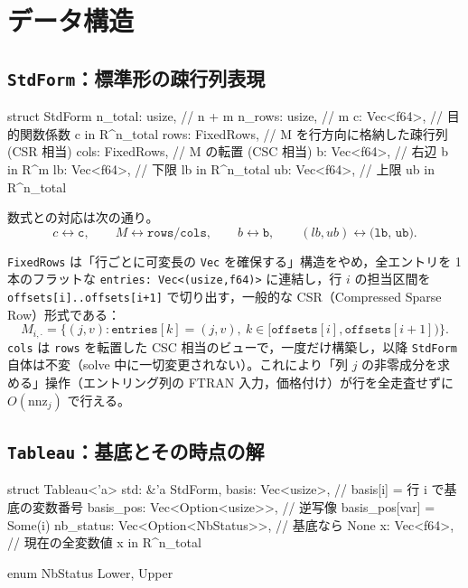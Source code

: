 \documentclass[11pt,a4paper]{ltjsarticle}
\newcommand{\code}[1]{\texttt{#1}}
\begin{document}
\section{データ構造}

\subsection{\code{StdForm}：標準形の疎行列表現}

\begin{rustcode}
struct StdForm {
    n_total: usize,      // n + m
    n_rows:  usize,      // m
    c:   Vec<f64>,       // 目的関数係数 c in R^{n_total}
    rows: FixedRows,     // M を行方向に格納した疎行列 (CSR 相当)
    cols: FixedRows,     // M の転置 (CSC 相当)
    b:   Vec<f64>,       // 右辺 b in R^m
    lb:  Vec<f64>,       // 下限 lb in R^{n_total}
    ub:  Vec<f64>,       // 上限 ub in R^{n_total}
}
\end{rustcode}

数式との対応は次の通り。
\[
  c \leftrightarrow \code{c},\qquad
  M \leftrightarrow \code{rows}/\code{cols},\qquad
  b \leftrightarrow \code{b},\qquad
  (lb,ub) \leftrightarrow \code{(lb, ub)}.
\]

\code{FixedRows} は「行ごとに可変長の \code{Vec} を確保する」構造をやめ，全エントリを 1 本のフラットな \code{entries: Vec<(usize,f64)>} に連結し，行 $i$ の担当区間を \code{offsets[i]..offsets[i+1]} で切り出す，一般的な CSR（Compressed Sparse Row）形式である：
\[
  M_{i,\cdot} = \{(j, v) : \code{entries}[k] = (j,v),\ k \in [\code{offsets}[i], \code{offsets}[i+1])\}.
\]
\code{cols} は \code{rows} を転置した CSC 相当のビューで，一度だけ構築し，以降 \code{StdForm} 自体は不変（solve 中に一切変更されない）。これにより「列 $j$ の非零成分を求める」操作（エントリング列の FTRAN 入力，価格付け）が行を全走査せずに $O(\mathrm{nnz}_j)$ で行える。

\subsection{\code{Tableau}：基底とその時点の解}

\begin{rustcode}
struct Tableau<'a> {
    std: &'a StdForm,
    basis: Vec<usize>,             // basis[i] = 行 i で基底の変数番号
    basis_pos: Vec<Option<usize>>, // 逆写像 basis_pos[var] = Some(i)
    nb_status: Vec<Option<NbStatus>>, // 基底なら None
    x: Vec<f64>,                   // 現在の全変数値 x in R^{n_total}
}

enum NbStatus { Lower, Upper }
\end{rustcode}
\end{document}
